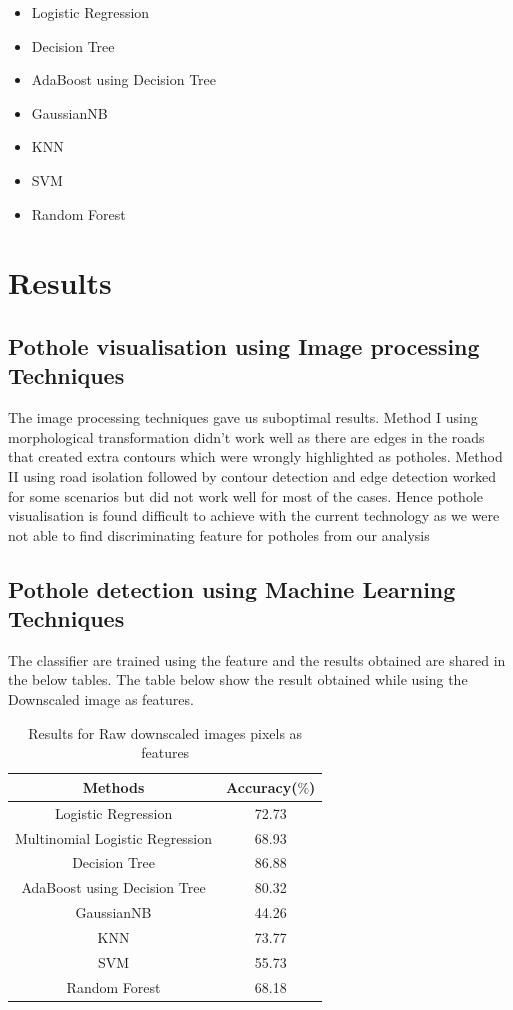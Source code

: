 \documentclass[journal]{IEEEtran}
\begin{document}
\begin{itemize}
\item Logistic Regression \cite{lr}
\item Decision Tree \cite{dt}
\item AdaBoost using Decision Tree
\item GaussianNB
\item KNN \cite{knn}
\item SVM \cite{svm}
\item Random Forest \cite{rf}
\end{itemize}

\section{Results}


\subsection{Pothole visualisation using Image processing Techniques}

The image processing techniques gave us suboptimal results. Method I using morphological transformation didn't work well as there are edges in the roads that created extra contours which were wrongly highlighted as potholes. Method II using road isolation followed by contour detection and edge detection worked for some scenarios but did not work well for most of the cases. Hence pothole visualisation is found difficult to achieve with the current technology as we were not able to find discriminating feature for potholes from our analysis

\subsection{Pothole detection using Machine Learning Techniques}

The classifier are trained using the feature and the results obtained are shared in the below tables.
The table below show the result obtained while using the Downscaled image as features.
\begin{center}
\begin{table}[h!]
\centering
\begin{tabular}{ |c|c| } 
 \hline
 \rowcolor{gray}
 Methods & Accuracy($\%$)  \\ 
 \hline
 Logistic Regression & 72.73 \\
 \hline
 Multinomial Logistic Regression & 68.93\\
 \hline
 Decision Tree & 86.88 \\ 
 \hline
 AdaBoost using Decision Tree & 80.32  \\ 
 \hline
 GaussianNB & 44.26 \\
 \hline
 KNN & 73.77\\
 \hline
 SVM & 55.73\\
 \hline
 Random Forest & 68.18\\
 \hline
\end{tabular}
\caption{Results for Raw downscaled images pixels as features}
\label{table:1}
\end{table}
\end{center}
\end{document}
